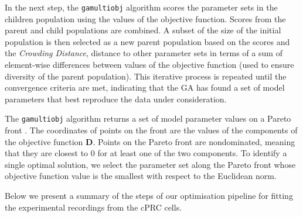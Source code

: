 \documentclass[
  10pt,
  onecolumn]{article}
\begin{document}
In the next step, the \texttt{gamultiobj} algorithm scores the parameter
sets in the children population using the values of the objective
function. Scores from the parent and child populations are combined. A
subset of the size of the initial population is then selected as a new
parent population based on the scores and the
\textit{Crowding Distance}, distance to other parameter sets in terms of
a sum of element-wise differences between values of the objective
function (used to ensure diversity of the parent
population)\cite{crowding_distance,GAbook}. This iterative process is
repeated until the convergence criteria are met, indicating that the GA
has found a set of model parameters that best reproduce the data under
consideration.

The \texttt{gamultiobj} algorithm returns a set of model parameter
values on a Pareto front \cite{censor1977pareto,GAbook}. The coordinates
of points on the front are the values of the components of the objective
function \(\mathbf{D}\). Points on the Pareto front are nondominated,
meaning that they are closest to 0 for at least one of the two
components. To identify a single optimal solution, we select the
parameter set along the Pareto front whose objective function value is
the smallest with respect to the Euclidean norm.

Below we present a summary of the steps of our optimisation pipeline for
fitting the experimental recordings from the cPRC cells.
\end{document}

